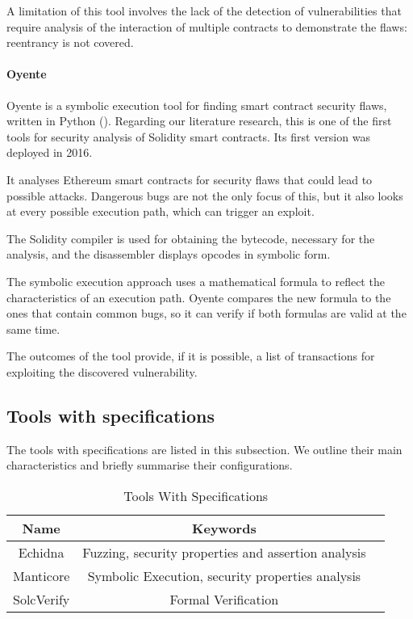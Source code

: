 \documentclass[a4paper,sigconf, language=french,
language=german, language=spanish, language=english]{acmart}
\begin{document}
A limitation of this tool involves the lack of the detection of vulnerabilities that require analysis of the interaction of
multiple contracts to demonstrate the flaws: reentrancy is not covered.

\paragraph{Oyente}
Oyente is a symbolic execution tool for finding smart contract security flaws, written in Python (\cite{Oyente}). 
Regarding our literature research, this is one of the first tools for security analysis of Solidity smart contracts. 
Its first version was deployed in 2016.

It analyses Ethereum smart contracts for security flaws that could lead to possible attacks.
Dangerous bugs are not the only focus of this, but it also looks at every possible execution path, which can trigger an exploit.

The Solidity compiler is used for obtaining the bytecode, necessary for the analysis, and the disassembler displays opcodes in symbolic form.

The symbolic execution approach uses a mathematical formula to reflect the characteristics of an execution path.
Oyente compares the new formula to the ones that contain common bugs, so it can verify if both formulas are valid at the same time. 

The outcomes of the tool provide, if it is possible, a list of transactions for exploiting the discovered vulnerability.

\subsection{Tools with specifications}

The tools with specifications are listed in this subsection. We outline their main characteristics and briefly summarise their configurations.

\begin{table*}
  \caption{Tools With Specifications}
  \label{tab:ToolsWithSpec}
  \begin{tabular}{ccl}
    \toprule
    Name & Keywords \\
    \midrule
    Echidna  & Fuzzing, security properties and assertion analysis\\
    Manticore  & Symbolic Execution, security properties analysis \\
    SolcVerify & Formal Verification \\
    \hline
  \end{tabular}
\end{table*}
\end{document}
